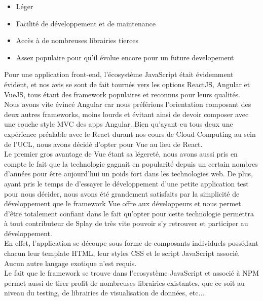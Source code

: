 \documentclass{eplmastersthesis}
\begin{document}
        \begin{itemize}
          \item Léger
          \item Facilité de développement et de maintenance
          \item Accès à de nombreuses librairies tierces
          \item Assez populaire pour qu'il évolue encore pour un future developement
        \end{itemize}

        Pour une application front-end, l'écosystème JavaScript était
        évidemment évident, et nos avis se sont de fait tournés vers
        les options ReactJS, Angular et VueJS, tous étant des framework
        populaires et reconnus pour leurs qualités.\\
        Nous avons vite évincé Angular car nous préférions l'orientation
        composant des deux autres frameworks, moins lourds et évitant
        ainsi de devoir composer avec une couche style MVC des apps Angular.
        Bien qu'ayant eu tous deux une expérience préalable avec le React
        durant nos cours de Cloud Computing au sein de l'UCL, nous avons
        décidé d'opter pour Vue au lieu de React.\\

        Le premier gros avantage de Vue étant sa légereté, nous avons
        aussi pris en compte le fait que la technologie gagnait en popularité
        depuis un certain nombres d'années pour être aujourd'hui un poids fort
        dans les technologies web. De plus, ayant pris le temps de d'essayer
        le développement d'une petite application test pour nous décider, nous
        avons été grandement satisfaits par la simplicité de développement que
        le framework Vue offre aux développeurs et nous permet d'être
        totalement confiant dans le fait qu'opter pour cette technologie
        permettra à tout contributeur de Splay de très vite pouvoir s'y
        retrouver et participer au développement.\\
        En effet, l'application se découpe sous forme de composants individuels
        possédant chacun leur template HTML, leur styles CSS et le script
        JavaScript associé. Aucun autre langage exotique n'est requis.\\
        Le fait que le framework se trouve dans l'ecosystème JavaScript et
        associé à NPM permet aussi de tirer profit de nombreuses librairies
        existantes, que ce soit au niveau du testing, de librairies de
        visualisation de données, etc...\\
\end{document}
